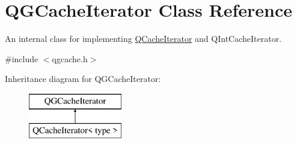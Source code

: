\hypertarget{class_q_g_cache_iterator}{}\section{Q\+G\+Cache\+Iterator Class Reference}
\label{class_q_g_cache_iterator}


An internal class for implementing \mbox{\hyperlink{class_q_cache_iterator}{Q\+Cache\+Iterator}} and Q\+Int\+Cache\+Iterator.  




{\ttfamily \#include $<$qgcache.\+h$>$}

Inheritance diagram for Q\+G\+Cache\+Iterator\+:\begin{figure}[H]
\begin{center}
\leavevmode
\includegraphics[height=2.000000cm]{class_q_g_cache_iterator}
\end{center}
\end{figure}
